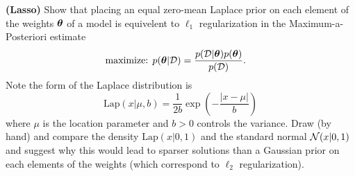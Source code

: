 \documentclass[12pt,letterpaper,fleqn]{hmcpset}
\begin{document}
\begin{problem}
\textbf{(Lasso)} Show that placing an equal zero-mean Laplace prior on each element of the weights $\hbox{\boldmath$\theta$}$
of a model is equivelent to $\ell_1$ regularization in the Maximum-a-Posteriori estimate
\begin{align*}
    \text{maximize: } & p(\hbox{\boldmath$\theta$} | {\cal D}) = \frac{p({\cal D} | \hbox{\boldmath$\theta$})p(\hbox{\boldmath$\theta$})}{p({\cal D})}.
\end{align*}
Note the form of the Laplace distribution is
\[
    \mathrm{Lap}(x|\mu,b) = \frac{1}{2b}\exp\left(-\frac{|x-\mu|}{b}\right)
\]
where $\mu$ is the location parameter and $b>0$ controls the variance. Draw (by hand) and compare the density
$\mathrm{Lap}(x|0,1)$ and the standard normal ${\cal N}(x|0,1)$ and suggest why this would
lead to sparser solutions than a Gaussian prior on each elements of the weights
(which correspond to $\ell_2$ regularization).
\end{problem}
\end{document}
